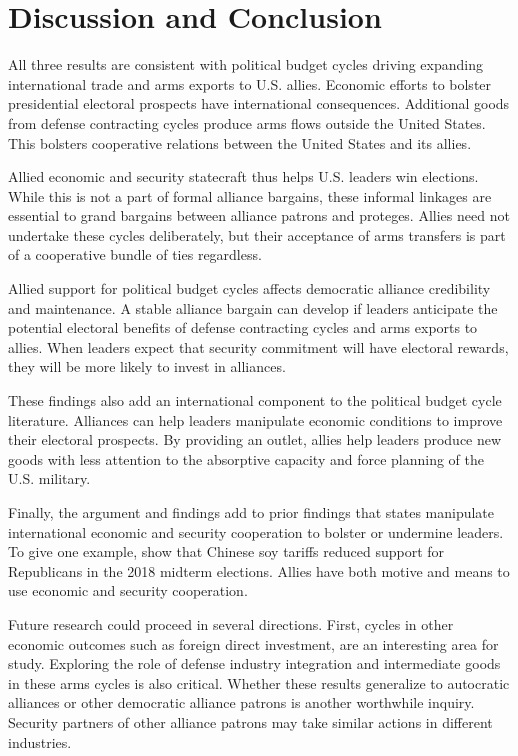 \documentclass[12pt]{article}
\begin{document}
\section{Discussion and Conclusion}


All three results are consistent with political budget cycles driving expanding international trade and arms exports to U.S. allies. 
Economic efforts to bolster presidential electoral prospects have international consequences. 
Additional goods from defense contracting cycles produce arms flows outside the United States.
This bolsters cooperative relations between the United States and its allies.


Allied economic and security statecraft thus helps U.S. leaders win elections. 
While this is not a part of formal alliance bargains, these informal linkages are essential to grand bargains between alliance patrons and proteges.
Allies need not undertake these cycles deliberately, but their acceptance of arms transfers is part of a cooperative bundle of ties regardless.


Allied support for political budget cycles affects democratic alliance credibility and maintenance. 
A stable alliance bargain can develop if leaders anticipate the potential electoral benefits of defense contracting cycles and arms exports to allies.
When leaders expect that security commitment will have electoral rewards, they will be more likely to invest in alliances. 


These findings also add an international component to the political budget cycle literature.
Alliances can help leaders manipulate economic conditions to improve their electoral prospects. 
By providing an outlet, allies help leaders produce new goods with less attention to the absorptive capacity and force planning of the U.S. military.


Finally, the argument and findings add to prior findings that states manipulate international economic and security cooperation to bolster or undermine leaders. 
To give one example, \citet{ChyzhUrbatsch2021} show that Chinese soy tariffs reduced support for Republicans in the 2018 midterm elections. 
Allies have both motive and means to use economic and security cooperation.


Future research could proceed in several directions. 
First, cycles in other economic outcomes such as foreign direct investment, are an interesting area for study. 
Exploring the role of defense industry integration and intermediate goods in these arms cycles is also critical.
Whether these results generalize to autocratic alliances or other democratic alliance patrons is another worthwhile inquiry. 
Security partners of other alliance patrons may take similar actions in different industries.
\end{document}
